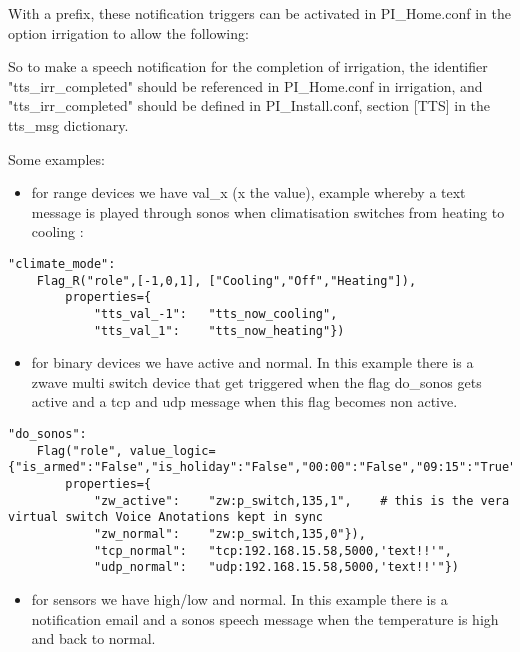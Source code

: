With a prefix, these notification triggers can be activated in
PI\_Home.conf in the option irrigation to allow the following:


So to make a speech notification for the completion of irrigation, the
identifier "tts\_irr\_completed" should be referenced in PI\_Home.conf
in irrigation, and "tts\_irr\_completed" should be defined in
PI\_Install.conf, section {[}TTS{]} in the tts\_msg dictionary.

Some examples:

\begin{itemize}
\item
  for range devices we have val\_x (x the value), example whereby a text
  message is played through sonos when climatisation switches from
  heating to cooling :
\end{itemize}

\begin{verbatim}
"climate_mode":         
    Flag_R("role",[-1,0,1], ["Cooling","Off","Heating"]), 
        properties={
            "tts_val_-1":   "tts_now_cooling",
            "tts_val_1":    "tts_now_heating"})
\end{verbatim}

\begin{itemize}
\item
  for binary devices we have active and normal. In this example there is
  a zwave multi switch device that get triggered when the flag do\_sonos
  gets active and a tcp and udp message when this flag becomes non
  active.
\end{itemize}

\begin{verbatim}
"do_sonos": 
    Flag("role", value_logic={"is_armed":"False","is_holiday":"False","00:00":"False","09:15":"True","22:30":"False"}, 
        properties={
            "zw_active":    "zw:p_switch,135,1",    # this is the vera virtual switch Voice Anotations kept in sync
            "zw_normal":    "zw:p_switch,135,0"}),
            "tcp_normal":   "tcp:192.168.15.58,5000,'text!!'", 
            "udp_normal":   "udp:192.168.15.58,5000,'text!!'"})
\end{verbatim}

\begin{itemize}
\item
  for sensors we have high/low and normal. In this example there is a
  notification email and a sonos speech message when the temperature is
  high and back to normal.
\end{itemize}

